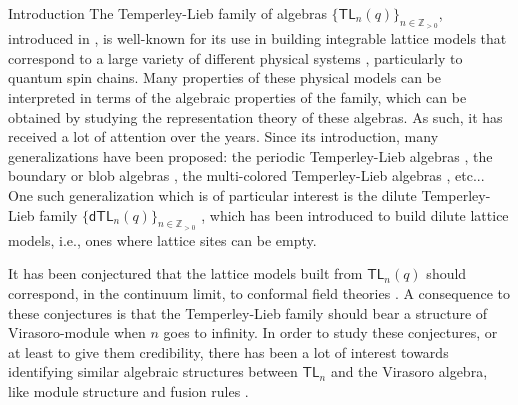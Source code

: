 \documentclass[reqno]{amsart}
\newcommand{\dtl}[1]{\mathsf{dTL}_{#1}}
\newcommand{\tl}[1]{\mathsf{TL}_{#1}}
\begin{document}
\begin{section}{Introduction}
The Temperley-Lieb family of algebras $\lbrace \tl{n}(q) \rbrace_{n\in \mathbb{Z}_{>0}}$, introduced in \cite{TemperleyLieb}, is well-known for its use in building integrable lattice models that correspond to a large variety of different physical systems \cite{Martin,Nienhuis}, particularly to quantum spin chains. Many properties of these physical models can be interpreted in terms of the algebraic properties of the family, which can be obtained by studying the representation theory of these algebras. As such, it has received a lot of attention over the years. Since its introduction, many generalizations have been proposed: the periodic Temperley-Lieb algebras \cite{GrahamLehrer,GreenFan,Greenseul,ErdmannGreen}, the boundary or blob algebras \cite{GrimmMartin}, the multi-colored Temperley-Lieb algebras \cite{GrimmPearce}, etc... One such generalization which is of particular interest is the dilute Temperley-Lieb family $\lbrace \dtl{n}(q) \rbrace_{n\in \mathbb{Z}_{>0}}$ \cite{Grimm,BelSY}, which has been introduced to build dilute lattice models, i.e., ones where lattice sites can be empty.

It has been conjectured that the lattice models built from $\tl{n}(q)$ should correspond, in the continuum limit, to conformal field theories \cite{KooSaleur,PasSaleur,PeRasZu}. A consequence to these conjectures is that the Temperley-Lieb family should bear a structure of Virasoro-module when $n$ goes to infinity. In order to study these conjectures, or at least to give them credibility, there has been a lot of interest towards identifying similar algebraic structures between $\tl{n}$ and the Virasoro algebra, like module structure \cite{GoodmanWenzl,Westbury,RiSY,BelRiSy} and fusion rules \cite{ReadSaleur1,ReadSaleur2,GainVass,PeaRasm}.


\end{section}
\end{document}
